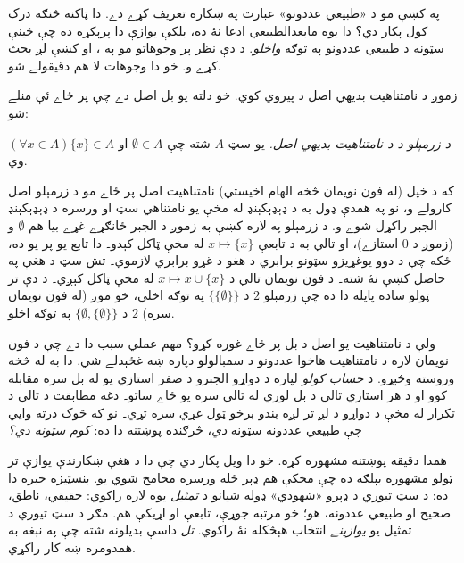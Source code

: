 \documentclass[../../../include/open-logic-section]{subfiles}
\begin{document}
	


په  کښې مو د «طبيعي عددونو»
عبارت په ښکاره تعريف کړے دے. دا ټاکنه څنګه درک کول پکار دي؟
دا يوه مابعدالطبيعي ادعا نۀ ده، بلکې يوازې دا پرېکړه ده چې ځينې
سټونه د طبيعي عددونو په توګه \emph{واخلو}. د دې نظر پر وجوهاتو مو
په ،  او
 کښې لږ بحث کړے و.
خو دا وجوهات لا هم دقيقولے شو.

زموږ د نامتناهيت بديهي اصل د \citet{VonNeumann1925} پيروي کوي.
خو دلته يو بل اصل دے چې پر ځاے ئې منلے شو:

\begin{defish}
\emph{د زرمېلو د \citeyear{Zermelo1908Untersuchungen} د نامتناهيت
بديهي اصل.} يو سټ $A$ شته چې $\emptyset \in A$ او
$(\forall x \in A)\{x\} \in A$ وي.
\end{defish}

که د خپل (له فون نويمان څخه الهام اخيستي) نامتناهيت اصل پر ځاے
مو د زرمېلو اصل کارولے و، نو په همدې ډول به د ډېډېکېنډ له مخې
يو نامتناهي سټ او ورسره د ډېډېکېنډ الجبر راکړل شوے و. د زرمېلو
په لاره کښې به زموږ د الجبر ځانګړے غړے بيا هم $\emptyset$ و
(زموږ د $0$ استازے)، او تالي به د تابعې
$x \mapsto \{x\}$ له مخې ټاکل کېدو۔ دا تابع يو پر يو ده،
ځکه چې د دوو يوغړيزو سټونو برابري د هغو د غړو برابري
لازموي۔ تش سټ د هغې په حاصل کښې نۀ شته۔ د فون نويمان
تالي د $x \mapsto x \cup \{x\}$ له مخې ټاکل کېږي۔
د دې تر ټولو ساده پايله دا ده
چې زرمېلو $2$ د $\{\{\emptyset\}\}$ په توګه اخلي، خو موږ
(له فون نويمان سره) $2$ د $\{\emptyset, \{\emptyset\}\}$ په توګه اخلو.

ولې د نامتناهيت يو اصل د بل پر ځاے غوره کړو؟ مهم عملي سبب دا
دے چې د فون نويمان لاره د نامتناهيت هاخوا عددونو د سمبالولو
دپاره ښه غځېدلے شي. دا به له  څخه
وروسته وڅېړو. د \emph{حساب کولو} لپاره د دواړو الجبرو د
صفر استازي يو له بل سره مقابله کوو او د هر استازي تالي د
بل لوري له تالي سره يو ځاے ساتو۔ دغه مطابقت د تالي د تکرار
له مخې د دواړو د لږ تر لږه بندو برخو ټول غړي سره تړي۔
نو که څوک درته وايي چې طبيعي عددونه سټونه
\emph{دي}، څرګنده پوښتنه دا ده: \emph{کوم سټونه دي؟}

همدا دقيقه پوښتنه \citet{Benacerraf1965} مشهوره کړه.
خو دا ويل پکار دي چې دا د هغې ښکارندې يوازې تر ټولو مشهوره
بېلګه ده چې مخکې هم ډېر ځله ورسره مخامخ شوي يو. بنسټيزه خبره
دا ده: د سټ تيوري د ډېرو «شهودي» ډوله شيانو د \emph{تمثيل}
يوه لاره راکوي: حقيقي، ناطق، صحيح او طبيعي عددونه، هو؛ خو
مرتبه جوړې، تابعې او اړيکې هم. مګر د سټ تيوري د تمثيل يو
\emph{يوازينے} انتخاب هېڅکله نۀ راکوي. \emph{تل} داسې بديلونه
شته چې په نېغه به همدومره ښه کار راکړي.
\end{document}
